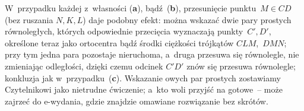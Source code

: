 {\begin{dwieszpalty}
W~przypadku każdej z~własności ({\bf{a}}), bądź~({\bf{b}}), przesunięcie punktu~${M\in{CD}}$ (bez ruszania $N,K,L$) daje podobny efekt: można wskazać dwie pary prostych równoległych, których odpowiednie przecięcia wyznaczają punkty~$C',D'$, określone teraz jako ortocentra bądź środki ciężkości trójkątów $CLM$,~$DMN$; przy tym jedna para pozostaje nieruchoma, a~druga przesuwa się równolegle, nie zmieniając odległości, dzięki czemu odcinek $C'D'$ znów się przesuwa równolegle; konkluzja jak w~przypadku~({\bf{c}}). Wskazanie owych par prostych zostawiamy Czytelnikowi jako nietrudne ćwiczenie; a~kto woli przyjść na gotowe~-- może zajrzeć do e-wydania, gdzie znajdzie omawiane rozwiązanie bez skrótów.

\end{dwieszpalty}
}


